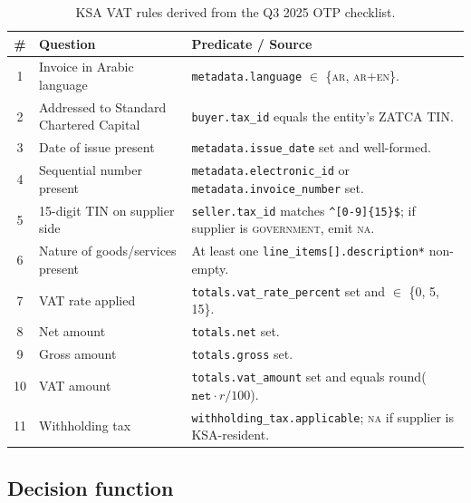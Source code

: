 \documentclass[11pt,a4paper,twoside]{report}
\begin{document}
\begin{table}[htbp]
\centering
\caption{KSA VAT rules derived from the Q3 2025 OTP checklist.}
\label{tab:ksa-rules}
\footnotesize
\begin{tabularx}{\linewidth}{@{}c l X@{}}
\toprule
\textbf{\#} & \textbf{Question} & \textbf{Predicate / Source} \\ \midrule
1  & Invoice in Arabic language
& \texttt{metadata.language} $\in$ \{\textsc{ar}, \textsc{ar+en}\}. \\
2  & Addressed to Standard Chartered Capital
& \texttt{buyer.tax\_id} equals the entity's ZATCA TIN. \\
3  & Date of issue present
& \texttt{metadata.issue\_date} set and well-formed. \\
4  & Sequential number present
& \texttt{metadata.electronic\_id} or \texttt{metadata.invoice\_number} set. \\
5  & 15-digit TIN on supplier side
& \texttt{seller.tax\_id} matches \verb|^[0-9]{15}$|; if supplier is \textsc{government}, emit \textsc{na}. \\
6  & Nature of goods/services present
& At least one \texttt{line\_items[].description*} non-empty. \\
7  & VAT rate applied
& \texttt{totals.vat\_rate\_percent} set and $\in$ \{0, 5, 15\}. \\
8  & Net amount
& \texttt{totals.net} set. \\
9  & Gross amount
& \texttt{totals.gross} set. \\
10 & VAT amount
& \texttt{totals.vat\_amount} set and equals round($\texttt{net} \cdot r / 100$). \\
11 & Withholding tax
& \texttt{withholding\_tax.applicable}; \textsc{na} if supplier is KSA-resident. \\
\bottomrule
\end{tabularx}
\end{table}

\subsection{Decision function}
\end{document}
